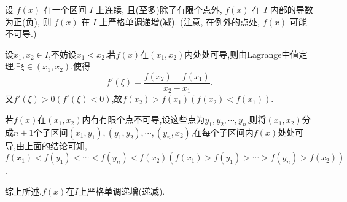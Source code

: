 



\begin{exercise}[3.3.16]
    设 $f(x)$ 在一个区间 $I$ 上连续, 且(至多)除了有限个点外, $f(x)$ 在 $I$ 内部的导数为正(负), 则 $f(x)$ 在 $I$ 上严格单调递增(减). (注意, 在例外的点处, $f(x)$ 可能不可导.)
\end{exercise}

\begin{solution}
    设$x_1,x_2 \in I$,不妨设$x_1 < x_2$.若$f(x)$在$(x_1,x_2)$内处处可导,则由Lagrange中值定理,$\exists \xi \in (x_1,x_2)$,使得
    $$
        f'(\xi) = \frac{f(x_2)-f(x_1)}{x_2-x_1}.
    $$
    又$f'(\xi) > 0 (f'(\xi) < 0)$,故$f(x_2) > f(x_1) (f(x_2) < f(x_1))$.

    若$f(x)$在$(x_1,x_2)$内有有限个点不可导,设这些点为$y_1,y_2,\cdots,y_n$,则将$(x_1,x_2)$分成$n+1$个子区间$(x_1,y_1),(y_1,y_2),\cdots,(y_n,x_2)$,在每个子区间内$f(x)$处处可导,由上面的结论可知,$f(x_1)<f(y_1)<\cdots<f(y_n)<f(x_2)\left(f(x_1)>f(y_1)>\cdots>f(y_n)>f(x_2)\right)$.
    
    综上所述,$f(x)$在$I$上严格单调递增(递减).
\end{solution}

